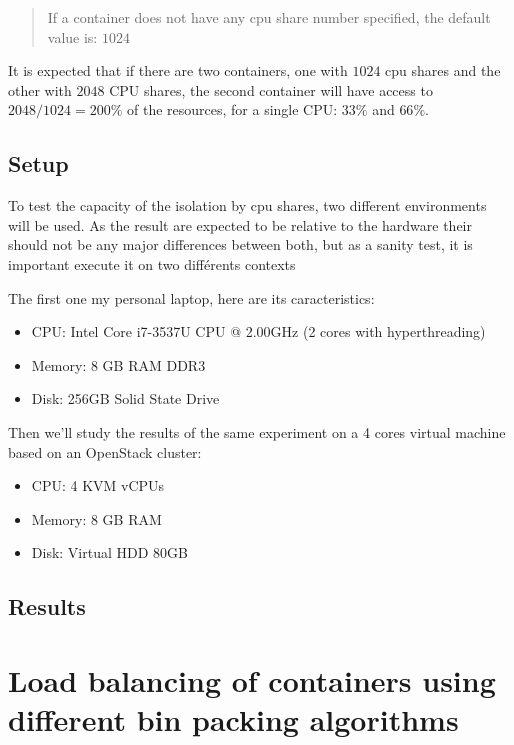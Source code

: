 \begin{quote}
If a container does not have any cpu share number specified, the default value
is: $1024$
\end{quote}

It is expected that if there are two containers, one with $1024$ cpu shares and
the other with $2048$ CPU shares, the second container will have access to
$2048/1024 = 200\%$ of the resources, for a single CPU: $33\%$ and $66\%$.

\subsection{Setup}

To test the capacity of the isolation by cpu shares, two different environments
will be used. As the result are expected to be relative to the hardware their should
not be any major differences between both, but as a sanity test, it is important
execute it on two différents contexts

The first one my personal laptop, here are its caracteristics:

\begin{itemize}
	\item{CPU: Intel\textregistered \hspace{1pt} Core\texttrademark
	\hspace{1pt} i7-3537U CPU @ 2.00GHz (2 cores with hyperthreading)}
	\item{Memory: 8 GB RAM DDR3}
	\item{Disk: 256GB Solid State Drive}
\end{itemize}

Then we'll study the results of the same experiment on a 4 cores virtual machine
based on an OpenStack cluster:

\begin{itemize}
	\item{CPU: 4 KVM vCPUs}
	\item{Memory: 8 GB RAM}
	\item{Disk: Virtual HDD 80GB}
\end{itemize}

\subsection{Results}

\section{Load balancing of containers using different bin packing algorithms}
